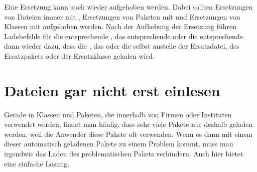 \begin{Declaration}
\end{Declaration}
Eine Ersetzung kann auch wieder
aufgehoben werden. Dabei sollten Ersetzungen von Dateien immer mit
, Ersetzungen von Paketen mit 
und Ersetzungen von Klassen mit  aufgehoben werden. Nach
der Aufhebung der Ersetzung führen Ladebefehle für die entsprechende
, das entsprechende  oder die entsprechende
 dann wieder dazu, dass die , das 
oder die  selbst anstelle der Ersatzdatei, des Ersatzpakets oder
der Ersatzklasse geladen wird.%
\EndIndexGroup


\section{Dateien gar nicht erst einlesen}

Gerade in Klassen und Paketen, die
innerhalb von Firmen oder Instituten verwendet werden, findet man häufig, dass
sehr viele Pakete nur deshalb geladen werden, weil die Anwender diese Pakete
oft verwenden. Wenn es dann mit einem dieser automatisch geladenen Pakete zu
einem Problem kommt, muss man irgendwie das Laden des problematischen Pakets
verhindern. Auch hier bietet  eine einfache Lösung.

